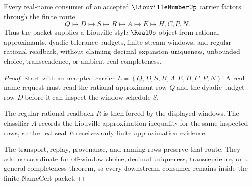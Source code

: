 \begin{theorem}
\label{thm:liouville-number-finite-approximation-handoff}
Every real-name consumer of an accepted $\LiouvilleNumberUp$ carrier factors through the finite route
$$
Q \longmapsto D \longmapsto S \longmapsto R \longmapsto A \longmapsto E \longmapsto H,C,P,N .
$$
Thus the packet supplies a Liouville-style $\RealUp$ object from rational approximants, dyadic tolerance budgets, finite stream windows, and regular rational readback, without claiming decimal expansion uniqueness, unbounded choice, transcendence, or ambient real completeness.
\end{theorem}
\begin{proof}
Start with an accepted carrier $L=(Q,D,S,R,A,E,H,C,P,N)$. A real-name request must read the rational approximant row $Q$ and the dyadic budget row $D$ before it can inspect the window schedule $S$.

The regular rational readback $R$ is then forced by the displayed windows. The classifier $A$ records the Liouville approximation inequality for the same inspected rows, so the real seal $E$ receives only finite approximation evidence.

The transport, replay, provenance, and naming rows preserve that route. They add no coordinate for off-window choice, decimal uniqueness, transcendence, or a general completeness theorem, so every downstream consumer remains inside the finite NameCert packet.
\end{proof}

